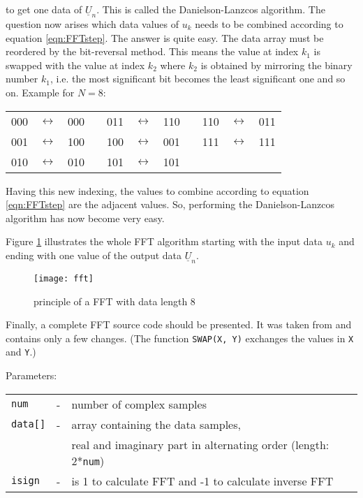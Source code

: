 to get one data of $\underline{U}_n$. This is called the
Danielson-Lanzcos algorithm.
The question now arises which data values of $u_k$
needs to be combined according to equation \ref{eqn:FFTstep}.
The answer is quite easy. The data array must be reordered by the
bit-reversal method. This means the value at index $k_1$ is swapped
with the value at index $k_2$ where $k_2$ is obtained by mirroring
the binary number $k_1$, i.e. the most significant bit becomes the
least significant one and so on. Example for $N=8$:

\addvspace{12pt}

\begin{tabular}{ccccccccccc}
000 & $\leftrightarrow$ & 000  & \qquad\qquad &  011 & $\leftrightarrow$ & 110  & \qquad\qquad &  110 & $\leftrightarrow$ & 011 \\
001 & $\leftrightarrow$ & 100  & \qquad\qquad &  100 & $\leftrightarrow$ & 001  & \qquad\qquad &  111 & $\leftrightarrow$ & 111 \\
010 & $\leftrightarrow$ & 010  & \qquad\qquad &  101 & $\leftrightarrow$ & 101 \\
\end{tabular}

\addvspace{12pt}

Having this new indexing, the values to combine according to
equation \ref{eqn:FFTstep} are the adjacent values. So, performing
the Danielson-Lanzcos algorithm has now become very easy.

\addvspace{12pt}

Figure \ref{fig:fft} illustrates the whole FFT algorithm starting with the
input data $u_k$ and ending with one value of the output data
$\underline{U}_n$.

\begin{figure}[htb]
\begin{center}
\texttt{[image: fft]}
\end{center}
\caption{principle of a FFT with data length 8}
\label{fig:fft}
\end{figure}
\FloatBarrier

Finally, a complete FFT source code should be presented. It was taken
from \cite{Press} and contains only a
few changes. (The function \texttt{SWAP(X, Y)} exchanges the values in
\texttt{X} and \texttt{Y}.)

\addvspace{12pt}

Parameters:\\
\begin{tabular}{lcl}
\texttt{num}    & - & number of complex samples\\
\texttt{data[]} & - & array containing the data samples,\\
                &   & real and imaginary part in alternating order (length: 2*\texttt{num})\\
\texttt{isign}  & - & is 1 to calculate FFT and -1 to calculate inverse FFT
\end{tabular}

